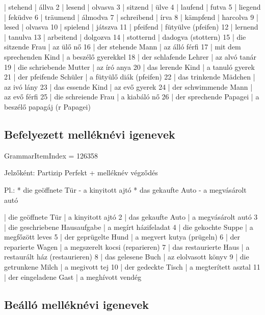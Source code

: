 \documentclass{article}
\newenvironment{desc}{\verbatim}{\endverbatim}
\newenvironment{exmp}{\verbatim}{\endverbatim}
\begin{document}
\begin{exmp}
1 | stehend | állva
2 | lesend | olvasva
3 | sitzend | ülve
4 | laufend | futva
5 | liegend | feküdve
6 | träumend | álmodva
7 | schreibend | írva
8 | kämpfend | harcolva
9 | lesed | olvasva
10 | spielend | játszva
11 | pfeifend | fütyülve (pfeifen)
12 | lernend | tanulva
13 | arbeitend | dolgozva
14 | stotternd | dadogva (stottern)
15 | die sitzende Frau | az ülő nő
16 | der stehende Mann | az álló férfi
17 | mit dem sprechenden Kind | a beszélő gyerekkel
18 | der schlafende Lehrer | az alvó tanár
19 | die schriebende Mutter | az író anya
20 | das lerende Kind | a tanuló gyerek
21 | der pfeifende Schüler | a fütyülő diák (pfeifen)
22 | das trinkende Mädchen | az ivó lány
23 | das essende Kind | az evő gyerek
24 | der schwimmende Mann | az evő férfi
25 | die schreiende Frau | a kiabáló nő
26 | der sprechende Papagei | a beszélő papagáj (r Papagei)
\end{exmp}

\subsection{Befelyezett melléknévi igenevek}

GrammarItemIndex = 126358

\begin{desc}
Jelzőként: Partizip Perfekt + melléknév végződés

Pl.: * die geöffnete Tür - a kinyitott ajtó
* das gekaufte Auto - a megvásárolt autó
\end{desc}

\begin{exmp}
1 | die geöffnete Tür | a kinyitott ajtó
2 | das gekaufte Auto | a megvásárolt autó
3 | die geschriebene Hausaufgabe | a megírt házifeladat
4 | die gekochte Suppe | a megfőzött leves
5 | der geprügelte Hund | a megvert kutya (prügeln)
6 | der reparierte Wagen | a megszerelt kocsi (reparieren)
7 | das restaurierte Haus | a restaurált ház (restaurieren)
8 | das gelesene Buch | az elolvasott könyv
9 | die getrunkene Milch | a megivott tej
10 | der gedeckte Tisch | a megterített asztal
11 | der eingeladene Gast | a meghívott vendég
\end{exmp}

\subsection{Beálló melléknévi igenevek}
\end{document}

